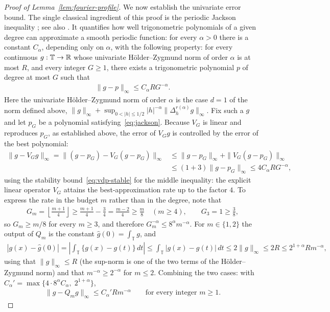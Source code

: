 \begin{proof}[Proof of Lemma~\ref{lem:fourier-profile}]
We now establish the univariate error bound. The single classical ingredient of this proof is the periodic Jackson inequality \citep{Temlyakov2018}; see also \citet{Zygmund2002}. It quantifies how well trigonometric polynomials of a given degree can approximate a smooth periodic function: for every $\alpha>0$ there is a constant $C_\alpha$, depending only on $\alpha$, with the following property: for every continuous $g:\mathbb T\to\mathbb{R}$ whose univariate H\"older--Zygmund norm of order $\alpha$ is at most $R$, and every integer $G\geq1$, there exists a trigonometric polynomial $p$ of degree at most $G$ such that
\begin{align}
\|g-p\|_\infty\leq C_\alpha RG^{-\alpha}.
\label{eq:jackson}
\end{align}
Here the univariate H\"older--Zygmund norm of order $\alpha$ is the case $d=1$ of the norm defined above, $\|g\|_\infty+\sup_{0<|h|\leq1/2}|h|^{-\alpha}\|\Delta_h^{r(\alpha)}g\|_\infty$. Fix such a $g$ and let $p_{G}$ be a polynomial satisfying~\eqref{eq:jackson}. Because $V_G$ is linear and reproduces $p_G$, as established above, the error of $V_Gg$ is controlled by the error of the best polynomial:
\begin{align*}
\|g-V_Gg\|_\infty
=\|(g-p_G)-V_G(g-p_G)\|_\infty
&\leq\|g-p_G\|_\infty+\|V_G(g-p_G)\|_\infty\\
&\leq(1+3)\|g-p_G\|_\infty
\leq4C_\alpha RG^{-\alpha},
\end{align*}
using the stability bound~\eqref{eq:vdp-stable} for the middle inequality: the explicit linear operator $V_G$ attains the best-approximation rate up to the factor $4$. To express the rate in the budget $m$ rather than in the degree, note that
\begin{align*}
G_m=\left\lfloor\frac{m+1}4\right\rfloor
\geq\frac{m+1}4-\frac34=\frac{m-2}4\geq\frac m8
\quad(m\geq4),
\qquad
G_3=1\geq\frac38,
\end{align*}
so $G_m\geq m/8$ for every $m\geq3$, and therefore $G_m^{-\alpha}\leq8^\alpha m^{-\alpha}$. For $m\in\{1,2\}$ the output of $Q_m$ is the constant $\hat g(0)=\int_{\mathbb T}g$, and
\begin{align*}
|g(x)-\hat g(0)|
=\left|\int_{\mathbb T}\{g(x)-g(t)\}\,dt\right|
\leq\int_{\mathbb T}|g(x)-g(t)|\,dt
\leq2\|g\|_\infty\leq2R\leq2^{1+\alpha}Rm^{-\alpha},
\end{align*}
using that $\|g\|_\infty\leq R$ (the sup-norm is one of the two terms of the H\"older--Zygmund norm) and that $m^{-\alpha}\geq2^{-\alpha}$ for $m\leq2$. Combining the two cases: with $C_\alpha'=\max\{4\cdot8^\alpha C_\alpha,\;2^{1+\alpha}\}$,
\begin{align}
\|g-Q_mg\|_\infty\leq C_\alpha'Rm^{-\alpha}
\qquad\text{for every integer }m\geq1.
\label{eq:coordinate-Jackson}
\end{align}


\end{proof}
